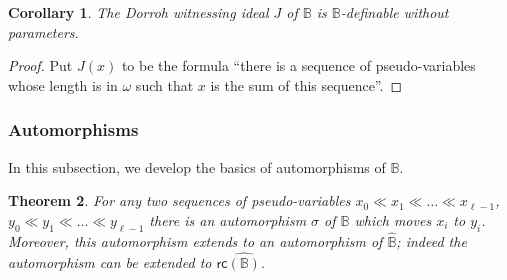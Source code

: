 \documentclass{amsart}
\newtheorem{theorem}{Theorem}[section]
\newtheorem{cor}[theorem]{Corollary}
\newcommand{\QS}{\mathbb{B}}
\begin{document}
\begin{cor}
    The Dorroh witnessing ideal $J$ of $\QS$ is $\QS$-definable without parameters.
\end{cor}
\begin{proof}
Put $J(x)$ to be the formula ``there is a sequence of pseudo-variables whose length is in $\omega$ such that $x$ is the sum of this sequence''.
\end{proof}

\subsubsection{Automorphisms} 

In this subsection, we develop the basics of automorphisms of $\mathbb{B}$.

\begin{theorem}\label{lem_aut_IOpen+Coll}
    For any two sequences of pseudo-variables $x_0\ll x_1\ll \ldots \ll x_{\ell-1}$, 
    $y_0\ll y_1\ll \ldots \ll y_{\ell-1}$ 
    there is an automorphism $\sigma$ of $\QS$ which moves $x_i$ to $y_i$. Moreover, 
    this automorphism extends to an automorphism of $\hat {\mathbb B}$;
    indeed the automorphism can be extended to $\mathsf{rc}\hat{(\mathbb{B})}.$
\end{theorem}
\end{document}
